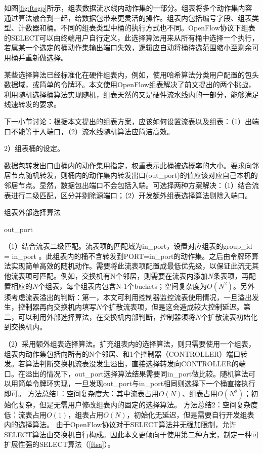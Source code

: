 如图\ref{fig:ftsgp}所示，组表数据流水线内动作集的一部分。组表将多个动作集内容通过算法融合到一起，给数据包带来更灵活的操作。组表内包括编号字段、组表类型、计数器和桶。不同的组表类型中桶的执行方式也不同。OpenFlow协议下组表的SELECT可以由终端用户自行定义，此选择算法用来从所有桶中选择一个执行，若属某一个选定的桶动作集输出端口失效，逻辑应自动将桶待选范围缩小至剩余可用桶并重新做选择。

某些选择算法已经标准化在硬件组表内，例如，使用哈希算法分类用户配置的包头数据域，或简单的令牌环。本文使用OpenFlow组表解决了前文提出的两个挑战，利用随机选择桶算法实现随机，组表天然的又是硬件流水线内的一部分，能够满足线速转发的要求。

下一小节讨论：根据本文提出的组表方案，应该如何设置流表以及组表：（1）出端口不能等于入端口，（2）流水线随机算法应简洁高效。


2）组表桶的设定。

数据包转发出口由桶内的动作集用指定，权重表示此桶被选概率的大小。要求向邻居节点随机转发，则桶内的动作集内转发出口(out\_port)的值应该对应自己本机的邻居节点。显然，数据包出端口不会包括入端。可选择两种方案解决：（1）结合流表进行二级匹配，区分并剔除源端口；（2）开发额外组表选择算法剔除入端口。

\begin{algorithm}[!h]
	\caption{组表外部选择算法 \label{ftsa}}
	\IncMargin{2em}
	\DontPrintSemicolon
	
	
	\Return out\_port
	
\end{algorithm}

（1）结合流表二级匹配。流表项的匹配域为in\_port，设置对应组表的group\_id = in\_port 。此组表内的桶不含转发到PORT=in\_port的动作集。之后由令牌环算法实现简单高效的随机动作。需要将此流表项配置成最低优先级，以保证此流无其他流表项可匹配。例如，交换机有N个邻居，则需要在流表内添加$ N $条表项，再配置相应的$ N $个组表，每个组表内包含N-1个buckets；空间复杂度为$O(N^2)$。另外须考虑流表溢出的判断：第一，本文可利用控制器监控流表使用情况，一旦溢出发生，控制器再向交换机内填写$ N $个扩散流表项，但是这会造成较大控制延迟。第二，可以利用外部选择算法，在交换机内部判断，控制器须将$ N $个扩散流表初始化到交换机内。

（2）采用额外组表选择算法。扩充组表内的选择算法，则只需要使用一个组表，组表内动作集包括向所有的N个邻居、和1个控制器（CONTROLLER）端口转发。若算法判断交换机流表没发生溢出，直接选择转发向CONTROLLER的端口。在溢出的情况下，out\_port选择算法结果需要同in\_port做比较。随机算法可以用简单令牌环实现，一旦发现out\_port与in\_port相同则选择下一个桶直接执行即可。
方法总结1：空间复杂度大：其中流表占用$O(N)$、组表占用$O(N^2)$；初始化复杂，但是无需用户修改组表内的固定的选择算法。
方法总结2：空间复杂度低：流表占用$O(1)$，组表占用$O(N)$，初始化无延迟，但是需要自行开发组表内的选择算法。
由于OpenFlow协议对于SELECT算法并无强加限制，允许SELECT算法由交换机自行构成。因此本文更倾向于使用第二种方案，制定一种可扩展性强的SELECT算法（\ref{ftsa}）。



